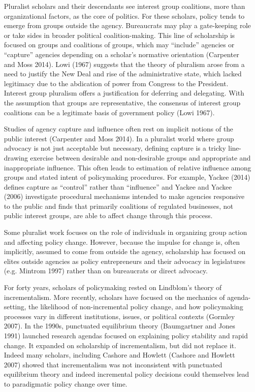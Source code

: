 Pluralist scholars and their descendants see interest group coalitions, more than organizational factors, as the core of politics. For these scholars, policy tends to emerge from groups outside the agency. Bureaucrats may play a gate-keeping role or take sides in broader political coalition-making. This line of scholarship is focused on groups and coalitions of groups, which may ``include'' agencies or ``capture'' agencies depending on a scholar's normative orientation (Carpenter and Moss 2014).
Lowi (1967) suggests that the theory of pluralism arose from a need to justify the New Deal and rise of the administrative state, which lacked legitimacy due to the abdication of power from Congress to the President. Interest group pluralism offers a justification for deferring and delegating. With the assumption that groups are representative, the consensus of interest group coalitions can be a legitimate basis of government policy (Lowi 1967).

Studies of agency capture and influence often rest on implicit notions of the public interest (Carpenter and Moss 2014). In a pluralist world where group advocacy is not just acceptable but necessary, defining capture is a tricky line-drawing exercise between desirable and non-desirable groups and appropriate and inappropriate influence. This often leads to estimation of relative influence among groups and stated intent of policymaking procedures. For example, Yackee (2014) defines capture as ``control'' rather than ``influence'' and Yackee and Yackee (2006) investigate procedural mechanisms intended to make agencies responsive to the public and finds that primarily coalitions of regulated businesses, not public interest groups, are able to affect change through this process. 

Some pluralist work focuses on the role of individuals in organizing group action and affecting policy change. However, because the impulse for change is, often implicitly, assumed to come from outside the agency, scholarship has focused on elites outside agencies as policy entrepreneurs and their advocacy in legislatures (e.g. Mintrom 1997) rather than on bureaucrats or direct advocacy. 

For forty years, scholars of policymaking rested on Lindblom's theory of incrementalism. More recently, scholars have focused on the mechanics of agenda-setting, the likelihood of non-incremental policy change, and how policymaking processes vary in different institutions, issues, or political contexts  (Gormley 2007). In the 1990s, punctuated equilibrium theory (Baumgartner and Jones 1991) launched research agendas focused on explaining policy stability and rapid change. It expanded on scholarship of incrementalism, but did not replace it. Indeed many scholars, including Cashore and Howlett (Cashore and Howlett 2007) showed that incrementalism was not inconsistent with punctuated equilibrium theory and indeed incremental policy decisions could themselves lead to paradigmatic policy change over time. 

